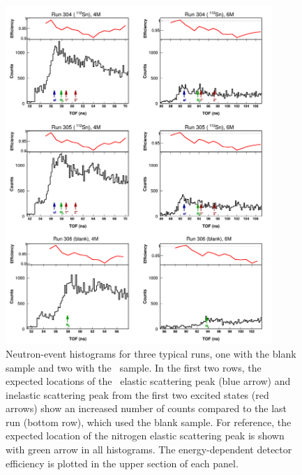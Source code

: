 \begin{figure}[ht!]
    \centering
    \includegraphics[width=0.9\textwidth]{figures/tiledRunData.png}
    \caption[Histograms from typical runs showing neutron elastic scattering peak]
    {
        Neutron-event histograms for three typical runs, one with the blank
        sample and two with the \snTwelve\ sample.
        In the first two rows, the expected locations of the \snTwelve\ elastic scattering peak 
        (blue arrow)
        and inelastic scattering peak from the first two excited states (red arrows) show an
        increased number of counts compared to the last run (bottom row), which used the blank
        sample. For reference, the expected location of the nitrogen elastic scattering
        peak is shown with green arrow in all histograms.
        The energy-dependent detector efficiency is plotted in the upper section of
        each panel.
    }
    \label{tiledRunData}
\end{figure}

